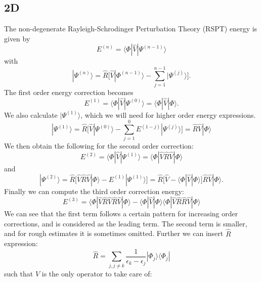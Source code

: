 \documentclass[norsk,a4paper,12pt]{article}
\begin{document}
\subsection*{2D}
The non-degenerate Rayleigh-Schrodinger Perturbation Theory (RSPT) energy is given by
\begin{equation}
E^{(n)}=\langle \Phi|\hat{V}|\Psi^{(n-1)}\rangle
\end{equation}
with
\begin{equation}
|\Psi^{(n)}\rangle=\hat{R}\bigg[\hat{V}|\Phi^{(n-1)}\rangle-\sum_{j=1}^{n-1}|\Psi^{(j)}\rangle\bigg].
\end{equation}
The first order energy correction becomes
\begin{equation*}
E^{(1)}=\langle\Phi|\hat{V}|\Psi^{(0)}\rangle=\langle\Phi|\hat{V}|\Phi\rangle.
\end{equation*}
We also calculate $|\Psi^{(1)}\rangle$, which we will need for higher order energy expressions. 
\begin{equation*}
|\Psi^{(1)}\rangle=\hat{R}\bigg[\hat{V}|\Psi^{(0)}\rangle-\sum_{j=1}^{0}E^{(1-j)}|\Psi^{(j)}\rangle\bigg]=\hat{R}\hat{V}|\Phi\rangle
\end{equation*}
We then obtain the following for the second order correction:
\begin{equation*}
E^{(2)}=\langle\Phi|\hat{V}|\Psi^{(1)}\rangle=\langle\Phi|\hat{V}\hat{R}\hat{V}|\Phi\rangle
\end{equation*}
and
\begin{equation*}
|\Psi^{(2)}\rangle=\hat{R}\bigg[\hat{V}\hat{R}\hat{V}|\Phi\rangle-E^{(1)}|\Psi^{(1)}\rangle\bigg]=\hat{R}\bigg[\hat{V}-\langle\Phi|\hat{V}|\Phi\rangle\bigg]\hat{R}\hat{V}|\Phi\rangle.
\end{equation*}
Finally we can compute the third order correction energy:
\begin{equation*}
E^{(3)}=\langle\Phi|\hat{V}\hat{R}\hat{V}\hat{R}\hat{V}|\Phi\rangle-\langle\Phi|\hat{V}|\Phi\rangle\langle\Phi|\hat{V}\hat{R}\hat{R}\hat{V}|\Phi\rangle
\end{equation*}
We can see that the first term follows a certain pattern for increasing order corrections, and is considered as the leading term. The second term is smaller, and for rough estimates it is sometimes omitted. Further we can insert $\hat{R}$ expression:
\begin{equation}
\hat{R}=\sum_{j,j\neq k}\frac{1}{\epsilon_k-\epsilon_j}|\Phi_j\rangle\langle\Phi_j|
\end{equation}
such that $\hat{V}$ is the only operator to take care of:
\end{document}
